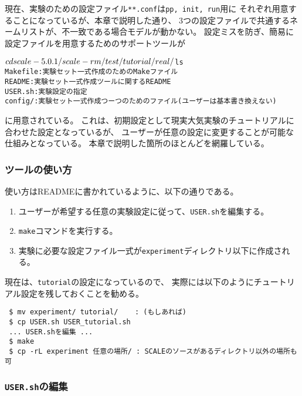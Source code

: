 \section{\SecMakeconfTool} \label{sec:basic_makeconf}

現在、実験のための設定ファイル\verb|**.conf|は\verb|pp, init, run|用に
それぞれ用意することになっているが、本章で説明した通り、
3つの設定ファイルで共通するネームリストが、不一致である場合モデルが動かない。
設定ミスを防ぎ、簡易に設定ファイルを用意するためのサポートツールが
\begin{alltt}
 $ cd scale-{\version}/scale-rm/test/tutorial/real/
 $ ls 
    Makefile : 実験セット一式作成のためのMakeファイル
    README   : 実験セット一式作成ツールに関するREADME
    USER.sh  : 実験設定の指定
    config/  : 実験セット一式作成つーつのためのファイル(ユーザーは基本書き換えない)
\end{alltt}
に用意されている。
これは、初期設定として現実大気実験のチュートリアルに合わせた設定となっているが、
ユーザーが任意の設定に変更することが可能な仕組みとなっている。
本章で説明した箇所のほとんどを網羅している。

\subsubsection{ツールの使い方}

使い方はREADMEに書かれているように、以下の通りである。
\begin{enumerate}
  \item ユーザーが希望する任意の実験設定に従って、\verb|USER.sh|を編集する。
  \item \verb|make|コマンドを実行する。
  \item 実験に必要な設定ファイル一式が\verb|experiment|ディレクトリ以下に作成される。
\end{enumerate}

現在は、\verb|tutorial|の設定になっているので、
実際には以下のようにチュートリアル設定を残しておくことを勧める。
\begin{verbatim}
 $ mv experiment/ tutorial/    : (もしあれば)
 $ cp USER.sh USER_tutorial.sh
 ... USER.shを編集 ...
 $ make
 $ cp -rL experiment 任意の場所/ : SCALEのソースがあるディレクトリ以外の場所も可
\end{verbatim}


\subsubsection{\texttt{USER.sh}の編集}

